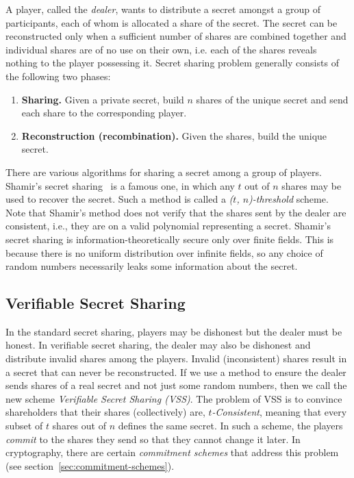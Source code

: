 \documentclass[11pt]{article}
\theoremstyle{plain}
\begin{document}
A player, called the \emph{dealer}, wants to distribute a secret amongst
a group of participants, each of whom is allocated a share of the
secret. The secret can be reconstructed only when a sufficient number
of shares are combined together and individual shares are of no use
on their own, i.e. each of the shares reveals nothing to the player
possessing it. Secret sharing problem generally consists of the following
two phases: 
\begin{enumerate}
	\item \textbf{Sharing.} Given a private secret, build $n$ shares of the
	unique secret and send each share to the corresponding player. 
	\item \textbf{Reconstruction (recombination).} Given the shares, build the
	unique secret. 
\end{enumerate}
There are various algorithms for sharing a secret among a group of
players. Shamir's secret sharing~\cite{shamir:how} is a famous one,
in which any $t$ out of $n$ shares may be used to recover the secret.
Such a method is called a \emph{($t$, $n$)-threshold} scheme. Note
that Shamir's method does not verify that the shares sent by the dealer
are consistent, i.e., they are on a valid polynomial representing
a secret. Shamir's secret sharing is information-theoretically secure
only over finite fields. This is because there is no uniform distribution
over infinite fields, so any choice of random numbers necessarily
leaks some information about the secret.

\subsection{Verifiable Secret Sharing}

\label{sec:vss} In the standard secret sharing, players may be dishonest
but the dealer must be honest. In verifiable secret sharing, the dealer
may also be dishonest and distribute invalid shares among the players.
Invalid (inconsistent) shares result in a secret that can never be
reconstructed. If we use a method to ensure the dealer sends shares
of a real secret and not just some random numbers, then we call the
new scheme \emph{Verifiable Secret Sharing (VSS)}. The problem of
VSS is to convince shareholders that their shares (collectively) are,
\emph{$t$-Consistent}, meaning that every subset of $t$ shares out
of $n$ defines the same secret. In such a scheme, the players \emph{commit}
to the shares they send so that they cannot change it later. In cryptography,
there are certain \emph{commitment schemes} that address this problem
(see section~\ref{sec:commitment-schemes}).
\end{document}
